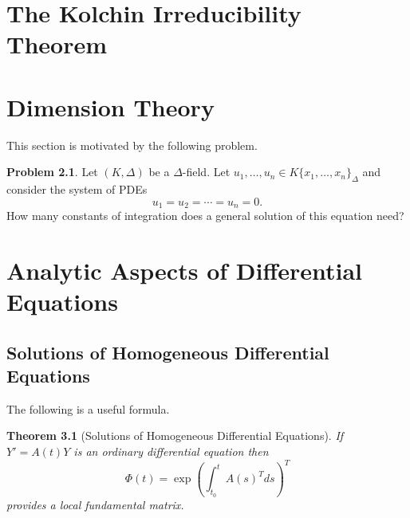 \documentclass[12pt]{book}
\numberwithin{equation}{section}
\newtheorem{theorem}{Theorem}[subsection]
\theoremstyle{definition}
\newtheorem{problem}[theorem]{Problem}
\theoremstyle{remark}
\begin{document}
\chapter[Kolchin Irreducibility]{The Kolchin Irreducibility Theorem}\label{S:kolchin-irreducibility}


\chapter[Dimension Theory]{Dimension Theory}\label{S:dimension-theory}

This section is motivated by the following problem.
\begin{problem}
	Let $(K,\Delta)$ be a $\Delta$-field. 
	Let $u_1,\ldots,u_n \in K\lbrace x_1,\ldots,x_n\rbrace_{\Delta}$ and consider the system of PDEs
	 $$ u_1=u_2=\cdots=u_n=0. $$
	How many constants of integration does a general solution of this equation need?
\end{problem}



\appendix 

\chapter[Analytic Aspects]{Analytic Aspects of Differential Equations}

\section{Solutions of Homogeneous Differential Equations}
The following is a useful formula.
\begin{theorem}[Solutions of Homogeneous Differential Equations]\label{T:solutions}
	If $Y'= A(t)Y$ is an ordinary differential equation then 
	 $$ \Phi(t) = \exp( \int_{t_0}^t A(s)^T ds )^T $$
	provides a local fundamental matrix. 
\end{theorem}
\end{document}
